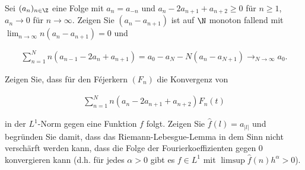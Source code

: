 
\begin{exercise}

Sei $(a_n)_{n \in \Z}$ eine Folge mit $a_n = a_{-n}$ und $a_n - 2 a_{n+1} + a_{n+2} \geq 0$ für $n \geq 1$, $a_n \to 0$ für $n \to \infty$.
Zeigen Sie $(a_n - a_{n+1})$ ist auf $\N$ monoton fallend mit $\lim_{n \to \infty} n (a_n - a_{n+1}) = 0$ und

\begin{align} \label{eq:1}
    \sum_{n=1}^N
    n (a_{n-1} - 2 a_n + a_{n+1})
    =
    a_0 - a_N - N (a_n - a_{N+1})
    \to_{N \to \infty}
    a_0.
\end{align}

Zeigen Sie, dass für den Féjerkern $(F_n)$ die Konvergenz von

\begin{align} \label{eq:2}
    \sum_{n=1}^N
    n (a_n - 2 a_{n+1} + a_{n+2}) F_n(t)
\end{align}

in der $L^1$-Norm gegen eine Funktion $f$ folgt.
Zeigen Sie $\hat f(l) = a_{|l|}$ und begründen Sie damit, dass das Riemann-Lebesgue-Lemma in dem Sinn nicht verschärft werden kann, dass die Folge der Fourierkoeffizienten  gegen $0$ konvergieren kann (d.h. für jedes $\alpha > 0$ gibt es $f \in L^1$ mit $\limsup \hat f(n) h^\alpha > 0$).

\end{exercise}


